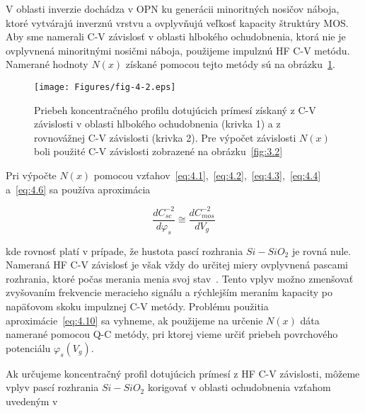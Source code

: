 V oblasti inverzie dochádza v OPN ku generácii minoritných nosičov
náboja, ktoré vytvárajú inverznú vrstvu a ovplyvňujú veľkosť kapacity
štruktúry MOS\@. Aby sme namerali C-V závislosť v oblasti hlbokého
ochudobnenia, ktorá nie je ovplyvnená minoritnými nosičmi náboja,
použijeme impulznú HF C-V metódu. Namerané hodnoty $N(x)$ získané
pomocou tejto metódy sú na obrázku~\ref{fig:4.2}.

\begin{figure}[h!]\centering
  \begin{minipage}[c]{\myfiguresize}
    \begin{center}
      \texttt{[image: Figures/fig-4-2.eps]}%
      \caption[Priebeh koncentračného profilu dotujúcich prímesí
        získaný z C-V závislosti v oblasti hlbokého ochudobnenia a z
        rovnovážnej C-V závislosti]{Priebeh koncentračného profilu
        dotujúcich prímesí získaný z C-V závislosti v oblasti hlbokého
        ochudobnenia (krivka 1) a z rovnovážnej C-V závislosti (krivka
        2). Pre výpočet závislosti $N(x)$ boli použité C-V závislosti
        zobrazené na obrázku~\ref{fig:3.2}}\label{fig:4.2}
    \end{center}
  \end{minipage}
\end{figure}

\par Pri výpočte $N(x)$ pomocou
vzťahov~\ref{eq:4.1},~\ref{eq:4.2},~\ref{eq:4.3},~\ref{eq:4.4}
a~\ref{eq:4.6} sa používa aproximácia

\begin{equation}\label{eq:4.10}
  \frac{dC_{sc}^{-2}}{d\varphi_{s}} \cong \frac{dC_{mos}^{-2}}{dV_{g}}
\end{equation}

kde rovnosť platí v prípade, že hustota pascí rozhrania $Si-SiO_{2}$
je rovná nule. Nameraná HF C-V závislosť je však vždy do určitej miery
ovplyvnená pascami rozhrania, ktoré počas merania menia svoj
stav~\cite{4.15}. Tento vplyv možno zmenšovať zvyšovaním frekvencie
meracieho signálu a rýchlejším meraním kapacity po napäťovom skoku
impulznej C-V metódy.  Problému použitia aproximácie~\ref{eq:4.10} sa
vyhneme, ak použijeme na určenie $N(x)$ dáta namerané pomocou Q-C
metódy, pri ktorej vieme určiť priebeh povrchového potenciálu
$\varphi_{s}(V_{g})$.

\par Ak určujeme koncentračný profil dotujúcich prímesí z HF C-V
závislosti, môžeme vplyv pascí rozhrania $Si-SiO_{2}$ korigovať v
oblasti ochudobnenia vzťahom uvedeným v~\cite{I.1}


